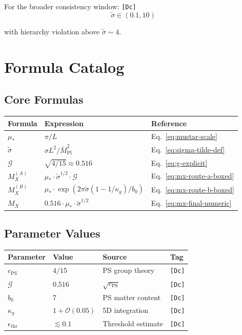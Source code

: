 \documentclass[11pt,a4paper]{article}
\newcommand{\tagDc}{\textcolor{blue!70!black}{\texttt{[Dc]}}}
\theoremstyle{definition}
\begin{document}
For the broader consistency window: \tagDc{}
\begin{equation}
\label{eq:sigma-range-broad}
\tilde{\sigma} \in (0.1, 10)
\end{equation}

with hierarchy violation above $\tilde{\sigma} \sim 4$.

\section{Formula Catalog}
\label{app:formulas}

\subsection{Core Formulas}
\label{app:core-formulas}

\begin{center}
\begin{tabular}{lll}
\toprule
Formula & Expression & Reference \\
\midrule
$\mu_*$ & $\pi/L$ & Eq.~\ref{eq:mustar-scale} \\
$\tilde{\sigma}$ & $\sigma L^2/\bar{M}_{\text{Pl}}^2$ & Eq.~\ref{eq:sigma-tilde-def} \\
$\mathcal{G}$ & $\sqrt{4/15} \approx 0.516$ & Eq.~\ref{eq:g-explicit} \\
$M_X^{(A)}$ & $\mu_* \cdot \tilde{\sigma}^{1/2} \cdot \mathcal{G}$ & Eq.~\ref{eq:mx-route-a-boxed} \\
$M_X^{(B)}$ & $\mu_* \cdot \exp(2\pi\tilde{\sigma}(1-1/\kappa_g)/b_0)$ & Eq.~\ref{eq:mx-route-b-boxed} \\
$M_X$ & $0.516 \cdot \mu_* \cdot \tilde{\sigma}^{1/2}$ & Eq.~\ref{eq:mx-final-numeric} \\
\bottomrule
\end{tabular}
\end{center}

\subsection{Parameter Values}
\label{app:param-values}

\begin{center}
\begin{tabular}{llll}
\toprule
Parameter & Value & Source & Tag \\
\midrule
$c_{\text{PS}}$ & $4/15$ & PS group theory & \tagDc{} \\
$\mathcal{G}$ & $0.516$ & $\sqrt{c_{\text{PS}}}$ & \tagDc{} \\
$b_0$ & $7$ & PS matter content & \tagDc{} \\
$\kappa_g$ & $1 + \mathcal{O}(0.05)$ & 5D integration & \tagDc{} \\
$\epsilon_{\text{thr}}$ & $\lesssim 0.1$ & Threshold estimate & \tagDc{} \\
\bottomrule
\end{tabular}
\end{center}
\end{document}
